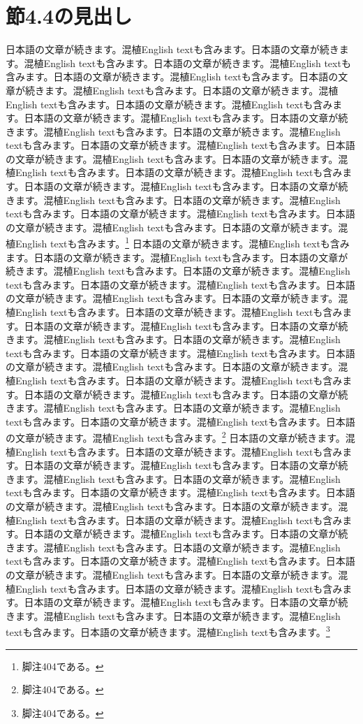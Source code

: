 \documentclass[pdflatex,book]{jlreq}
\begin{document}
\section{節4.4の見出し}
日本語の文章が続きます。混植English textも含みます。日本語の文章が続きます。混植English textも含みます。日本語の文章が続きます。混植English textも含みます。日本語の文章が続きます。混植English textも含みます。日本語の文章が続きます。混植English textも含みます。日本語の文章が続きます。混植English textも含みます。日本語の文章が続きます。混植English textも含みます。日本語の文章が続きます。混植English textも含みます。日本語の文章が続きます。混植English textも含みます。日本語の文章が続きます。混植English textも含みます。日本語の文章が続きます。混植English textも含みます。日本語の文章が続きます。混植English textも含みます。日本語の文章が続きます。混植English textも含みます。日本語の文章が続きます。混植English textも含みます。日本語の文章が続きます。混植English textも含みます。日本語の文章が続きます。混植English textも含みます。日本語の文章が続きます。混植English textも含みます。日本語の文章が続きます。混植English textも含みます。日本語の文章が続きます。混植English textも含みます。日本語の文章が続きます。混植English textも含みます。\footnote{脚注404である。}
日本語の文章が続きます。混植English textも含みます。日本語の文章が続きます。混植English textも含みます。日本語の文章が続きます。混植English textも含みます。日本語の文章が続きます。混植English textも含みます。日本語の文章が続きます。混植English textも含みます。日本語の文章が続きます。混植English textも含みます。日本語の文章が続きます。混植English textも含みます。日本語の文章が続きます。混植English textも含みます。日本語の文章が続きます。混植English textも含みます。日本語の文章が続きます。混植English textも含みます。日本語の文章が続きます。混植English textも含みます。日本語の文章が続きます。混植English textも含みます。日本語の文章が続きます。混植English textも含みます。日本語の文章が続きます。混植English textも含みます。日本語の文章が続きます。混植English textも含みます。日本語の文章が続きます。混植English textも含みます。日本語の文章が続きます。混植English textも含みます。日本語の文章が続きます。混植English textも含みます。日本語の文章が続きます。混植English textも含みます。日本語の文章が続きます。混植English textも含みます。\footnote{脚注404である。}
日本語の文章が続きます。混植English textも含みます。日本語の文章が続きます。混植English textも含みます。日本語の文章が続きます。混植English textも含みます。日本語の文章が続きます。混植English textも含みます。日本語の文章が続きます。混植English textも含みます。日本語の文章が続きます。混植English textも含みます。日本語の文章が続きます。混植English textも含みます。日本語の文章が続きます。混植English textも含みます。日本語の文章が続きます。混植English textも含みます。日本語の文章が続きます。混植English textも含みます。日本語の文章が続きます。混植English textも含みます。日本語の文章が続きます。混植English textも含みます。日本語の文章が続きます。混植English textも含みます。日本語の文章が続きます。混植English textも含みます。日本語の文章が続きます。混植English textも含みます。日本語の文章が続きます。混植English textも含みます。日本語の文章が続きます。混植English textも含みます。日本語の文章が続きます。混植English textも含みます。日本語の文章が続きます。混植English textも含みます。日本語の文章が続きます。混植English textも含みます。\footnote{脚注404である。}
\end{document}
